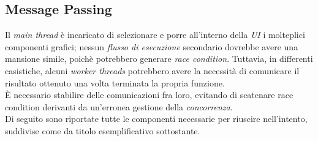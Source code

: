 \documentclass{article}
\begin{document}
\subsection*{Message Passing}
Il \textit{main thread} è incaricato di selezionare e porre all'interno della \textit{UI} i molteplici componenti grafici; nessun \textit{flusso di esecuzione} secondario dovrebbe avere una mansione simile, poichè potrebbero generare \textit{race condition}. Tuttavia, in differenti casistiche, alcuni \textit{worker threads} potrebbero avere la necessità di comunicare il risultato ottenuto una volta terminata la propria funzione.\vspace*{7pt}\\
È necessario stabilire delle comunicazioni fra loro, evitando di scatenare race condition derivanti da un'erronea gestione della \textit{concorrenza}.\vspace*{7pt}\\
Di seguito sono riportate tutte le componenti necessarie per riuscire nell'intento, suddivise come da titolo esemplificativo sottostante.
\begin{center}
  
\end{center}
\end{document}

